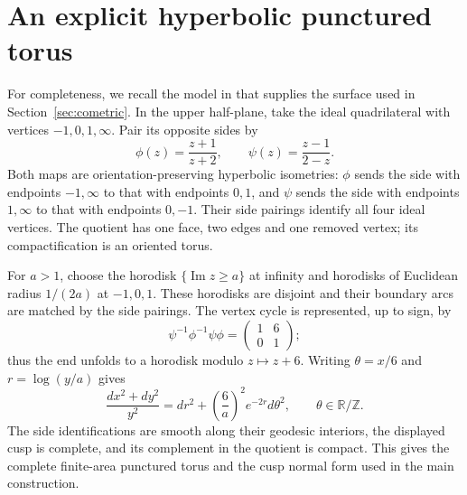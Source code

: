 \section{An explicit hyperbolic punctured torus}
\label{app:punctured-torus}

For completeness, we recall the model in
\cite[Section~5.5]{Bonahon2009} that supplies the surface used in
Section~\ref{sec:cometric}.  In the upper half-plane, take the ideal
quadrilateral with vertices $-1,0,1,\infty$.  Pair its opposite sides by
\[
 \phi(z)=\frac{z+1}{z+2},\qquad
 \psi(z)=\frac{z-1}{2-z}.
\]
Both maps are orientation-preserving hyperbolic isometries:
$\phi$ sends the side with endpoints $-1,\infty$ to that with endpoints
$0,1$, and $\psi$ sends the side with endpoints $1,\infty$ to that with
endpoints $0,-1$.  Their side pairings identify all four ideal vertices.
The quotient has one face, two edges and one removed vertex; its
compactification is an oriented torus.

For $a>1$, choose the horodisk $\{\operatorname{Im}z\ge a\}$ at infinity
and horodisks of Euclidean radius $1/(2a)$ at $-1,0,1$.
These horodisks are disjoint and their boundary arcs are matched by the
side pairings.  The vertex cycle is represented, up to sign, by
\[
 \psi^{-1}\phi^{-1}\psi\phi
 =\begin{pmatrix}1&6\\0&1\end{pmatrix};
\]
thus the end unfolds to a horodisk modulo $z\mapsto z+6$.
Writing $\theta=x/6$ and $r=\log(y/a)$ gives
\[
 \frac{dx^2+dy^2}{y^2}
 =dr^2+\left(\frac6a\right)^2e^{-2r}d\theta^2,
 \qquad \theta\in\mathbb R/\mathbb Z.
\]
The side identifications are smooth along their geodesic interiors,
the displayed cusp is complete, and its complement in the quotient is
compact.  This gives the complete finite-area punctured torus and the
cusp normal form used in the main construction.
